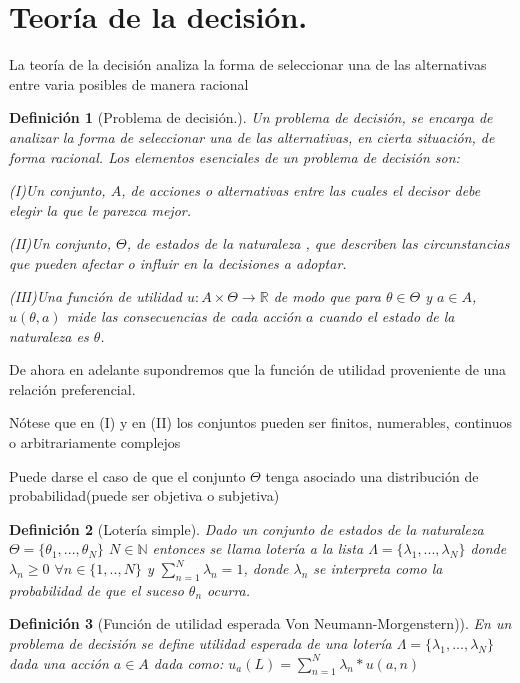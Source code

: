 \documentclass[a4paper]{report} %
\newcommand{\R}{\ensuremath{\mathbb{R}}}
\newtheorem{definicion}{Definición}[section]
\begin{document}

\section{Teoría de la decisión.}


La teoría de la decisión analiza la forma de seleccionar una de las alternativas entre varia posibles de manera racional
\begin{definicion}[Problema de decisión.]
Un problema de decisión, se encarga de analizar la forma de seleccionar una de las alternativas, en cierta situación, de forma racional.
Los elementos esenciales de un problema de decisión son:
  
  (I)Un conjunto, $A$, de acciones o alternativas entre las cuales el decisor debe elegir la que le parezca mejor.
  
  (II)Un conjunto, $\Theta$, de estados de la naturaleza , que describen las circunstancias que pueden afectar o influir en la decisiones a adoptar.
  
(III)Una función de utilidad $u:A \times  \Theta \to \R$ de modo que  para $\theta \in \Theta $ y $a \in A$, $u(\theta , a)$ mide las consecuencias de cada acción $a$ cuando el estado de la naturaleza es $\theta$.
\end{definicion}

   
De ahora en adelante supondremos que la función de utilidad proveniente de una relación preferencial.
 
Nótese que en (I) y en (II) los conjuntos pueden ser finitos, numerables, continuos o arbitrariamente complejos

Puede darse el caso de que el conjunto $\Theta$ tenga asociado una distribución de probabilidad(puede ser objetiva o subjetiva)
\begin{definicion}[Lotería simple]
Dado un conjunto de estados de la naturaleza $\Theta =\{ \theta_1,...,\theta_N \} $ $N \in \mathbb{N}$ entonces se llama lotería a la lista $\Lambda =\{ \lambda_1,...,\lambda_N\} $ donde $\lambda_n \ge 0$ $\forall n \in \{ 1,..,N\} $ y $\sum_{n=1}^{N} \lambda_n=1$, donde $\lambda_n$ se interpreta como la probabilidad de que el suceso $\theta_n$ ocurra.
\end{definicion}


\begin{definicion}[Función de utilidad esperada Von Neumann-Morgenstern)]
En un problema de decisión se define utilidad esperada de una lotería $ \Lambda =\{ \lambda_1,...,\lambda_N\} $ dada una acción $a \in A$ dada  como:
$u_a(L)=\sum_{n=1}^{N}\lambda_n*u(a,n)$

\end{definicion}
\end{document}
